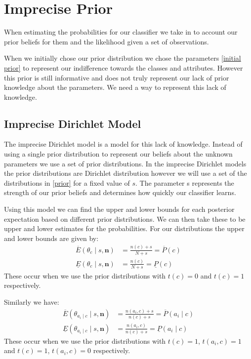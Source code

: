 \newcommand{\sn}[2]{\ensuremath{{#1}\times 10^{#2}}}

\chapter{Imprecise Prior}

When estimating the probabilities for our classifier we take in to account our prior beliefs for them and the likelihood given a set of observations.

When we initially chose our prior distribution we chose the parameters \cref{initial prior} to represent our indifference towards the classes and attributes.
However this prior is still informative and does not truly represent our lack of prior knowledge about the parameters.
We need a way to represent this lack of knowledge.

\section{Imprecise Dirichlet Model}

The imprecise Dirichlet model is a model for this lack of knowledge.
Instead of using a single prior distribution to represent our beliefs about the unknown parameters we use a set of prior distributions.
In the imprecise Dirichlet models the prior distributions are Dirichlet distribution however we will use a set of the distributions in \cref{prior} for a fixed value of $s$.
The parameter s represents the strength of our prior beliefs and determines how quickly our classifier learns.

Using this model we can find the upper and lower bounds for each posterior expectation based on different prior distributions.
We can then take these to be upper and lower estimates for the probabilities.
For our distributions the upper and lower bounds are given by:
\begin{align}
	\overline{E}(\theta_c \mid s, \mathbf{n}) & = \frac{n(c) + s}{N+s} = \overline{P}(c) \\
	\underline{E}(\theta_c \mid s, \mathbf{n}) & = \frac{n(c)}{N+s} = \underline{P}(c)
\end{align}
These occur when we use the prior distributions with $t(c) = 0$ and $t(c) = 1$ respectively.

Similarly we have:
\begin{align}
	\overline{E}(\theta_{a_i \mid c} \mid s, \mathbf{n}) & = \frac{n(a_i, c) + s}{n(c)+s} = \overline{P}(a_i \mid c) \\
	\underline{E}(\theta_{a_i \mid c} \mid s, \mathbf{n}) & = \frac{n(a_i, c)}{n(c)+s} = \underline{P}(a_i \mid c)
\end{align}
These occur when we use the prior distributions with $t(c) = 1$, $t(a_i, c)=1$ and $t(c) = 1$, $t(a_i, c)=0$ respectively.


